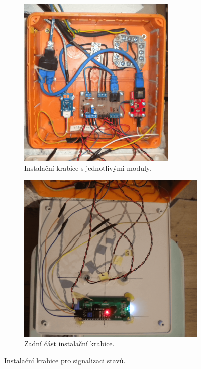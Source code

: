 \begin{figure}[H]
\centering
\begin{subfigure}{.5\textwidth}
  \centering
  \includegraphics[width=0.835\textwidth]{images/krb/instalacni-krabice-vnitrek-krb.png}
  \caption{Instalační krabice s jednotlivými moduly.}
  \label{fig:instalacni-krabice-vnitrek-krb}
\end{subfigure}%
\begin{subfigure}{.5\textwidth}
  \centering
  \includegraphics[width=\textwidth]{images/krb/zadni-cast-krytu-vika-instalacni-krabice-krb.png}
  \caption{Zadní část instalační krabice.}
  \label{fig:zadni-cast-krytu-vika-instalacni-krabice-krb}
\end{subfigure}
\caption{Instalační krabice pro signalizaci stavů.}
\label{fig:instalacni-krabice}
\end{figure}




